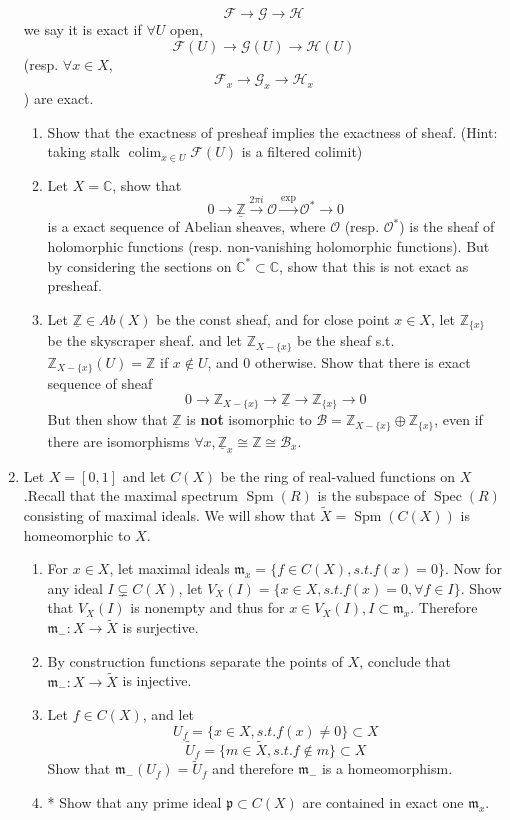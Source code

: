 \documentclass[a4paper,11pt]{article}
\def\bb#1{\mathbb{#1}}
\def\bZ{\mathbb{Z}}
\DeclareMathOperator{\colim}{colim}
\DeclareMathOperator{\Spm}{Spm}
\DeclareMathOperator{\Spec}{Spec}
\begin{document}
\begin{enumerate}[1.]
\[ \mathcal{F}\to\mathcal{G}\to\mathcal{H}\]
we say it is exact if $\forall U$ open,
\[ \mathcal{F}(U)\to\mathcal{G}(U)\to\mathcal{H}(U)\]  
(resp. $\forall x\in X$, \[ \mathcal{F}_x\to\mathcal{G}_x\to\mathcal{H}_x\]) are exact.
\begin{enumerate}
    \item Show that the exactness of presheaf implies the exactness of sheaf. (Hint: taking stalk $\colim_{x\in U}\mathcal{F}(U)$ is a filtered colimit)
    \item Let $X=\bb{C}$, show that 
    \[0\to \underline{\bZ}\xrightarrow{2\pi i}\mathcal{O}\xrightarrow{\exp} \mathcal{O}^*\to 0\]
    is a exact sequence of Abelian sheaves, where $\mathcal{O}$ (resp. $\mathcal{O}^*$) is the sheaf of holomorphic functions (resp. non-vanishing holomorphic functions). But by considering the sections on $\bb{C}^* \subset \bb{C}$, show that this is not exact as presheaf.
    \item Let $\underline{\bZ}\in Ab(X)$ be the const sheaf, and for close point $x\in X$, let $\bZ_{\{x\}}$ be the skyscraper sheaf. and let $\bZ_{X-\{x\}}$ be the sheaf s.t. $ \bZ_{X-\{x\}}(U)=\bZ$ if $x\notin U$, and $0$ otherwise. Show that there is exact sequence of sheaf 
    \[0\to\bZ_{X-\{x\}}\to \underline{\bZ}\to \bZ_{\{x\}}\to 0 \]
    But then show that $\underline{\bZ}$ is \textbf{not} isomorphic to $\mathcal{B}=\bZ_{X-\{x\}}\oplus \bZ_{\{x\}} $, even if there are isomorphisms $\forall x, \underline{\bZ}_x\cong \bZ\cong \mathcal{B}_x$.
\end{enumerate}

\item Let $X=[0,1]$ and let $C(X)$ be the ring of real-valued functions on $X$.Recall that the maximal spectrum $\Spm(R)$ is the subspace of $\Spec(R)$ consisting of maximal ideals. We will show that $\tilde{X}=\Spm(C(X))$ is homeomorphic to $X$.
\begin{enumerate}
    \item For $x\in X$, let maximal ideals $\mathfrak{m}_x=\{f\in C(X),s.t. f(x)=0\}$. Now for any ideal $I \subsetneq  C(X)$, let $V_X(I)=\{x\in X, s.t. f(x)=0, \forall f\in I\}$. Show that $V_X(I)$ is nonempty and thus for $x\in V_X(I),I\subset \mathfrak{m}_x$. Therefore $\mathfrak{m}_{-}:X\to \tilde{X}$ is surjective.
    \item By construction functions separate the points of $X$, conclude that $\mathfrak{m}_{-}: X\to \tilde{X}$ is injective.
    \item Let $f\in C(X)$, and let 
    \[U_f=\{x\in X, s.t. f(x)\neq0\}\subset X\]
    \[\tilde{U}_f=\{m\in \tilde{X}, s.t. f\notin m\}\subset X\] 
    Show that $\mathfrak{m}_{-}(U_f)=\tilde{U}_f$ and therefore $\mathfrak{m}_{-}$ is a homeomorphism.
    \item* Show that any prime ideal $\mathfrak{p}\subset C(X)$ are contained in exact one $\mathfrak{m}_{x}$.
\end{enumerate}


\end{enumerate}
\end{document}
